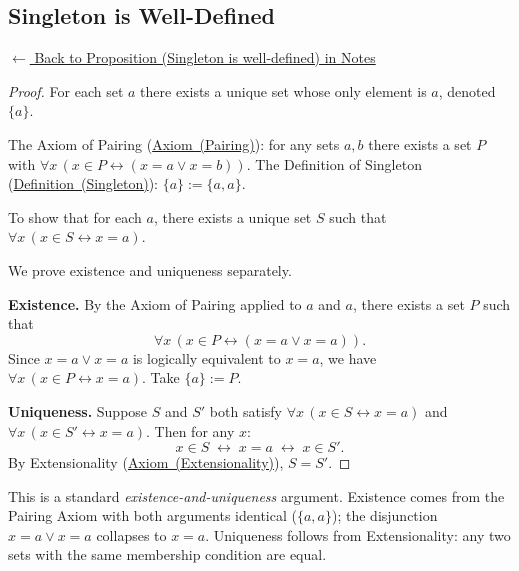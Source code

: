 
\subsection*{Singleton is Well-Defined}
\label{prf:singleton-well-defined}

\begin{remark*}[Return]
\hyperref[prop:singleton-well-defined]{$\leftarrow$ Back to Proposition (Singleton is well-defined) in Notes}
\end{remark*}

\begin{proof}
\Claim For each set $a$ there exists a unique set whose only element is $a$, denoted $\{a\}$.

\Given The Axiom of Pairing (\hyperref[ax:zf-pairing]{Axiom~(Pairing)}): for
any sets $a, b$ there exists a set $P$ with $\forall x\,(x \in P \leftrightarrow
(x = a \lor x = b))$. The Definition of Singleton
(\hyperref[def:singleton]{Definition~(Singleton)}): $\{a\} := \{a, a\}$.

\Goal To show that for each $a$, there exists a unique set $S$ such that
$\forall x\,(x \in S \leftrightarrow x = a)$.

\Strategy We prove existence and uniqueness separately.

\medskip
\noindent\textbf{Existence.} By the Axiom of Pairing applied to $a$ and $a$,
there exists a set $P$ such that
\[
    \forall x\,(x \in P \leftrightarrow (x = a \lor x = a)).
\]
Since $x = a \lor x = a$ is logically equivalent to $x = a$, we have
$\forall x\,(x \in P \leftrightarrow x = a)$. Take $\{a\} := P$.

\medskip
\noindent\textbf{Uniqueness.} Suppose $S$ and $S'$ both satisfy $\forall
x\,(x \in S \leftrightarrow x = a)$ and $\forall x\,(x \in S' \leftrightarrow
x = a)$. Then for any $x$:
\[
    x \in S \;\leftrightarrow\; x = a \;\leftrightarrow\; x \in S'.
\]
By Extensionality (\hyperref[ax:zf-extensionality]{Axiom~(Extensionality)}),
$S = S'$. \AsReq
\end{proof}

\begin{remark*}
This is a standard \emph{existence-and-uniqueness} argument. Existence comes
from the Pairing Axiom with both arguments identical ($\{a,a\}$); the
disjunction $x = a \lor x = a$ collapses to $x = a$. Uniqueness follows from
Extensionality: any two sets with the same membership condition are equal.
\end{remark*}

